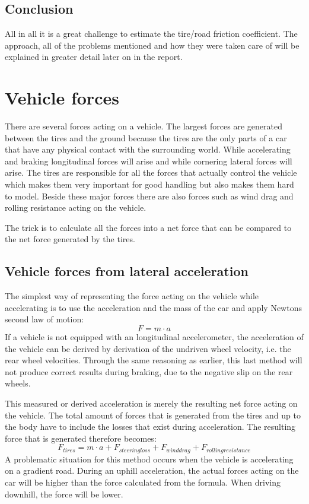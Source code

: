 \subsection{Conclusion}
All in all it is a great challenge to estimate the tire/road friction coefficient.  The approach, all of the problems mentioned and how they were taken care of will be explained in greater detail later on in the report.


\section{Vehicle forces}
There are several forces acting on a vehicle. The largest forces are generated between the tires and the ground because the tires are the only parts of a car that have any physical contact with the surrounding world. While accelerating and braking longitudinal forces will arise and while cornering lateral forces will arise. The tires are responsible for all the forces that actually control the vehicle which makes them very important for good handling but also makes them hard to model. Beside these major forces there are also forces such as wind drag and rolling resistance acting on the vehicle.

The trick is to calculate all the forces into a net force that can be compared to the net force generated by the tires.
\subsection{Vehicle forces from lateral acceleration}
The simplest way of representing the force acting on the vehicle while accelerating is to use the acceleration and the mass of the car and apply Newtons second law of motion:
\begin{equation}
	F = m \cdot a
\end{equation}
If a vehicle is not equipped with an longitudinal accelerometer, the acceleration of the vehicle can be derived by derivation of the undriven wheel velocity, i.e. the rear wheel velocities. Through the same reasoning as earlier, this last method will not produce correct results during braking, due to the negative slip on the rear wheels. 

This measured or derived acceleration is merely the resulting net force acting on the vehicle. The total amount of forces that is generated from the tires and up to the body have to include the losses that exist during acceleration. The resulting force that is generated therefore becomes: 
\begin{equation}
F_{tires} = m \cdot a + F_{steering loss} + F_{wind drag} + F_{rolling resistance}
\end{equation}
A problematic situation for this method occurs when the vehicle is accelerating on a gradient road. During an uphill acceleration, the actual forces acting on the car will be higher than the force calculated from the formula. When driving downhill, the force will be lower. 

